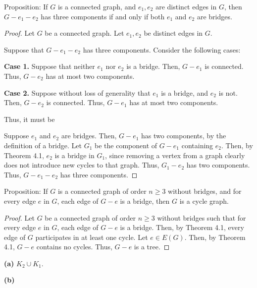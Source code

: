 \documentclass[12pt]{article}
\begin{document}
\newpage{} Proposition: If $G$ is a connected graph, and $e_1, e_2$ are distinct edges in $G$, then $G - e_1 - e_2$ has three components if and only if both $e_1$ and $e_2$ are bridges.
\begin{proof}
    Let $G$ be a connected graph.
    Let $e_1, e_2$ be distinct edges in $G$.

    Suppose that $G - e_1 - e_2$ has three components.
    Consider the following cases:

    {\bf Case 1.} Suppose that neither $e_1$ nor $e_2$ is a bridge.
    Then, $G-e_1$ is connected.
    Thus, $G-e_2$ has at most two components.

    {\bf Case 2.} Suppose without loss of generality that $e_1$ is a bridge, and $e_2$ is not.
    Then, $G-e_2$ is connected.
    Thus, $G-e_1$ has at most two components.

    Thus, it must be 

    Suppose $e_1$ and $e_2$ are bridges.
    Then, $G-e_1$ has two components, by the definition of a bridge.
    Let $G_1$ be the component of $G - e_1$ containing $e_2$.
    Then, by Theorem 4.1, $e_2$ is a bridge in $G_1$, since removing a vertex from a graph clearly does not introduce new cycles to that graph. %
    Thus, $G_1 - e_2$ has two components.
    Thus, $G - e_1 - e_2$ has three components.
\end{proof}

\newpage{} Proposition: If $G$ is a connected graph of order $n \geq 3$ without bridges, and for every edge $e$ in $G$, each edge of $G-e$ is a bridge, then $G$ is a cycle graph.
\begin{proof}
    Let $G$ be a connected graph of order $n \geq 3$ without bridges such that for every edge $e$ in $G$, each edge of $G-e$ is a bridge.
    Then, by Theorem 4.1, every edge of $G$ participates in at least one cycle.
    Let $e \in E(G)$.
    Then, by Theorem 4.1, $G-e$ contains no cycles.
    Thus, $G-e$ is a tree.
\end{proof}

\newpage{}

{\bf (a)} $K_2 \cup K_1$.

{\bf (b)}
\begin{center}
\end{center}
\end{document}
